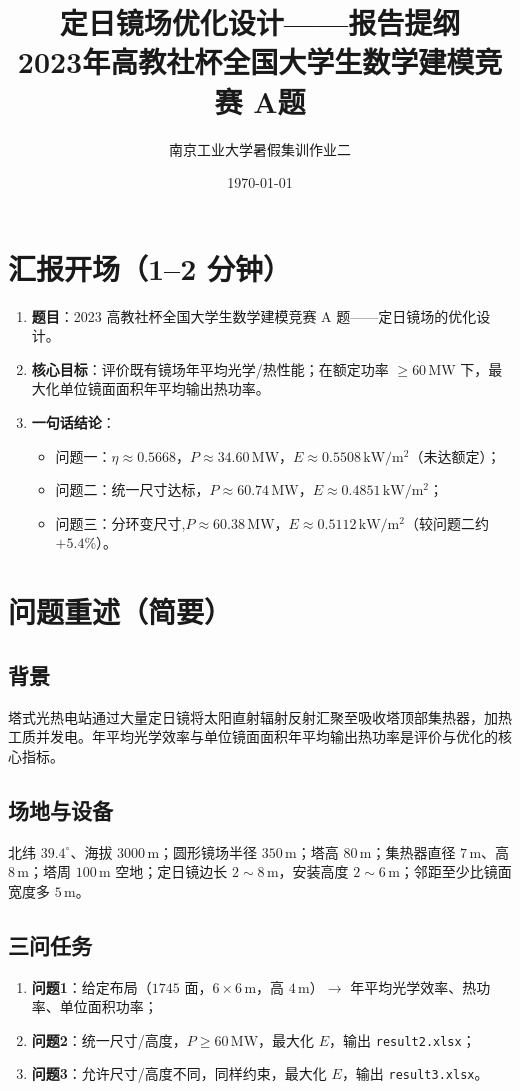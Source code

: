 \documentclass[12pt,a4paper]{ctexart}
\title{\textbf{定日镜场优化设计——报告提纲}\\[0.4em]
\large 2023年高教社杯全国大学生数学建模竞赛 A题}
\author{南京工业大学暑假集训\quad 作业二}
\date{\today}
\begin{document}
\maketitle
\tableofcontents
\newpage

\section{汇报开场（1--2 分钟）}
\begin{enumerate}
  \item \textbf{题目}：2023 高教社杯全国大学生数学建模竞赛 A 题——定日镜场的优化设计。
  \item \textbf{核心目标}：评价既有镜场年平均光学/热性能；在额定功率 $\ge 60\,\mathrm{MW}$ 下，最大化单位镜面面积年平均输出热功率。
  \item \textbf{一句话结论}：
  \begin{itemize}
    \item 问题一：$\eta\approx0.5668$，$P\approx34.60\,\mathrm{MW}$，$E\approx0.5508\,\mathrm{kW/m^2}$（未达额定）；
    \item 问题二：统一尺寸达标，$P\approx60.74\,\mathrm{MW}$，$E\approx0.4851\,\mathrm{kW/m^2}$；
    \item 问题三：分环变尺寸,$P\approx60.38\,\mathrm{MW}$，$E\approx0.5112\,\mathrm{kW/m^2}$（较问题二约 $+5.4\%$）。
  \end{itemize}
\end{enumerate}

\section{问题重述（简要）}
\subsection{背景}
塔式光热电站通过大量定日镜将太阳直射辐射反射汇聚至吸收塔顶部集热器，加热工质并发电。年平均光学效率与单位镜面面积年平均输出热功率是评价与优化的核心指标。

\subsection{场地与设备}
北纬 $39.4^\circ$、海拔 $3000\,\mathrm{m}$；圆形镜场半径 $350\,\mathrm{m}$；塔高 $80\,\mathrm{m}$；集热器直径 $7\,\mathrm{m}$、高 $8\,\mathrm{m}$；塔周 $100\,\mathrm{m}$ 空地；定日镜边长 $2\sim8\,\mathrm{m}$，安装高度 $2\sim6\,\mathrm{m}$；邻距至少比镜面宽度多 $5\,\mathrm{m}$。

\subsection{三问任务}
\begin{enumerate}
  \item \textbf{问题1}：给定布局（$1745$ 面，$6\times6\,\mathrm{m}$，高 $4\,\mathrm{m}$）$\rightarrow$ 年平均光学效率、热功率、单位面积功率；
  \item \textbf{问题2}：统一尺寸/高度，$P\ge60\,\mathrm{MW}$，最大化 $E$，输出 \texttt{result2.xlsx}；
  \item \textbf{问题3}：允许尺寸/高度不同，同样约束，最大化 $E$，输出 \texttt{result3.xlsx}。
\end{enumerate}
\end{document}
